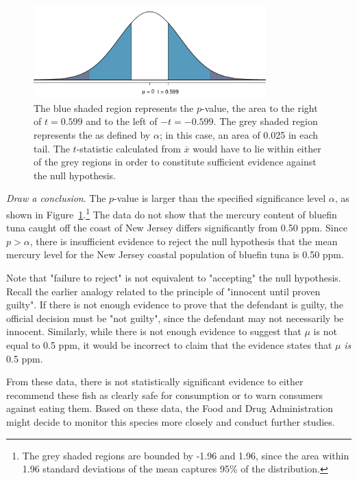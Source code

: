 \begin{example}
\begin{figure}[h]
	\centering
	\includegraphics[width=0.8\textwidth]{ch_inference_foundations_oi_biostat/figures/pValueTuna/pValueTuna}
	\caption{The blue shaded region represents the $p$-value, the area to the right of $t = 0.599$ and to the left of $-t = -0.599$. The grey shaded region represents the  as defined by $\alpha$; in this case, an area of 0.025 in each tail. The $t$-statistic calculated from $\overline{x}$ would have to lie within either of the grey regions in order to constitute sufficient evidence against the null hypothesis.}
	\label{pValueTuna}
\end{figure}

\textit{Draw a conclusion}. The $p$-value is larger than the specified significance level $\alpha$, as shown in Figure~\ref{pValueTuna}.\footnote{The grey shaded regions are bounded by -1.96 and 1.96, since the area within 1.96 standard deviations of the mean captures 95\% of the distribution.} The data do not show that the mercury content of bluefin tuna caught off the coast of New Jersey differs significantly from 0.50 ppm. Since $p > \alpha$, there is insufficient evidence to reject the null hypothesis that the mean mercury level for the New Jersey coastal population of bluefin tuna is 0.50 ppm. 

Note that "failure to reject" is not equivalent to "accepting" the null hypothesis. Recall the earlier analogy related to the principle of "innocent until proven guilty". If there is not enough evidence to prove that the defendant is guilty, the official decision must be "not guilty", since the defendant may not necessarily be innocent. Similarly, while there is not enough evidence to suggest that $\mu$ is not equal to 0.5 ppm, it would be incorrect to claim that the evidence states that $\mu$ \textit{is} 0.5 ppm.

From these data, there is not statistically significant evidence to either recommend these fish as clearly safe for consumption or to warn consumers against eating them. Based on these data, the Food and Drug Administration might decide to monitor this species more closely and conduct further studies. 

\end{example}

